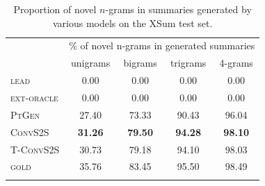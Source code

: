 \begin{table}
  \begin{center}{\fontsize{8.5}{11}\selectfont %
  \begin{tabular}{ l | c c c c } 
    \thickhline
    \multirow{2}{*}{Models} & \multicolumn{4}{c}{\% of novel n-grams in generated summaries}  \\
    & unigrams & bigrams & trigrams & 4-grams  \\ \thickhline 
    \textsc{lead} & 0.00 & 0.00 & 0.00 & 0.00 \\
    \textsc{ext-oracle} & 0.00 & 0.00 & 0.00 & 0.00 \\
    \textsc{PtGen} & 27.40 & 73.33 & 90.43 & 96.04 \\ 
    \textsc{ConvS2S} & \textbf{31.26} & \textbf{79.50} & \textbf{94.28} & \textbf{98.10}\\
    \textsc{T-ConvS2S}  & 30.73 & 79.18 & 94.10 & 98.03 \\ \hline
    \textsc{gold} & 35.76 & 83.45  & 95.50  & 98.49 \\ \thickhline
  \end{tabular}}
  \end{center}
  \caption{Proportion of novel $n$-grams in summaries generated by various models on the XSum test set.
    \label{tab:novelngram-xsum-models}}
\end{table}

